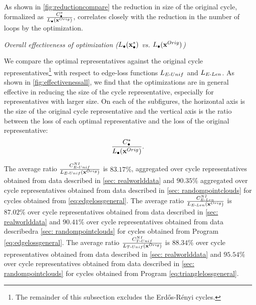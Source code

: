As shown in \fig \ref{fig:reductioncompare} the reduction in size of the original cycle, formalized as $\frac{C^*_\bullet}{L_\bullet(\mathbf{x}^{Orig})}$,  correlates closely with the reduction in the number of loops by the optimization.


\noindent \emph{Overall effectiveness of optimization ($L_\bullet(\mathbf{x}_\bullet^*)$ vs. $L_\bullet(\mathbf{x}^{Orig})$)} 

We compare the optimal representatives against the original cycle representatives\footnote{The remainder of this subsection excludes the Erd\H{o}s-R\'enyi cycles.} with respect to edge-loss functions $L_{E\text{-}Unif}$ and $L_{E\text{-}Len}$. As shown in \fig \ref{fig:effectivenessall}, we find that the optimizations are in general effective in reducing the size of the cycle representative, especially for representatives with larger size. On each of the subfigures, the horizontal axis is the size of the original cycle representative and the vertical axis is the ratio between the loss of each optimal representative and the loss of the original representative:
$$\frac{C^*_\bullet}{L_\bullet(\mathbf{x}^{Orig})}.$$ 

The average ratio $\frac{C^{NI}_{E\text{-}Unif}}{L_{E\text{-}Unif}(\mathbf{x}^{Orig})}$ is $83.17\%$, aggregated over cycle representatives obtained from data described in \se \ref{sec: realworlddata} and $90.35\%$  aggregated over cycle representatives obtained from data described in \se \ref{sec: randompointclouds} for cycles obtained from \pr \eqref{eq:edgelossgeneral}. The average ratio $\frac{C^{NI}_{E\text{-}Len}}{L_{E\text{-}Len}(\mathbf{x}^{Orig})}$ is $87.02\%$ over cycle representatives obtained from data described in \se \ref{sec: realworlddata} and $90.41\%$ over cycle representatives obtained from data describedra \se \ref{sec: randompointclouds} for cycles obtained from Program \eqref{eq:edgelossgeneral}. The average ratio $\frac{C^{NI}_{T\text{-}Unif}}{L_{T\text{-}Unif}(\mathbf{x}^{Orig})}$ is $88.34\%$ over cycle representatives obtained from data described in \se \ref{sec: realworlddata} and $95.54\%$ over cycle representatives obtained from data described in \se \ref{sec: randompointclouds} for cycles obtained from Program \eqref{eq:trianglelossgeneral}.

